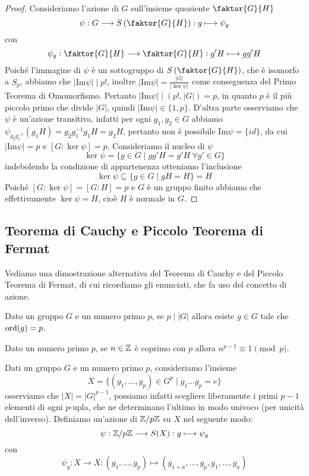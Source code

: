 \documentclass[11pt]{scrartcl}
\begin{document}
\begin{proof}
    Consideriamo l'azione di $G$ sull'insieme quoziente $\faktor{G}{H}$ 
    \[
        \psi: G\longrightarrow S\left(\faktor{G}{H}\right) : g \longmapsto \psi_g
    \]con 
    \[
        \psi_g : \faktor{G}{H}\longrightarrow\faktor{G}{H} : g'H\longmapsto gg'H
    \]Poiché l'immagine di $\psi$ è un sottogruppo di $S\left(\faktor{G}{H}\right)$,
    che è isomorfo a $S_p$, abbiamo che $|\mathrm{Im}\psi| \mid p!$, inoltre 
    $|\mathrm{Im}\psi| = \displaystyle\frac{|G|}{|\ker \psi|}$ come conseguenza
    del Primo Teorema di Omomorfismo. Pertanto $|\mathrm{Im}\psi| \mid (p!, |G|) = p$,
    in quanto $p$ è il più piccolo primo che divide $|G|$, quindi $|\mathrm{Im}\psi| \in \{1, p\}$.
    D'altra parte osserviamo che $\psi$ è un'azione transitiva, infatti per 
    ogni $g_1, g_2 \in G$ abbiamo $\psi_{g_2g_1^{-1}}(g_1H) = g_2g_1^{-1}g_1H = g_2H$,
    pertanto non è possibile $\mathrm{Im}\psi = \{id\}$, da cui $|\mathrm{Im}\psi| = p$
    e $[G:\ker\psi] = p$. Consideriamo il nucleo di $\psi$
    \[
        \ker\psi = \{g\in G\mid gg'H = g'H~\forall g' \in G\}
    \]indebolendo la condizione di appartenenza otteniamo l'inclusione
    \[
        \ker\psi \subseteq \{g \in G\mid gH = H\} = H
    \]Poiché $[G:\ker \psi] = [G : H] = p$ e $G$ è un gruppo finito abbiamo
    che effettivamente $\ker\psi = H$, cioè $H$ è normale in $G$.
\end{proof}


\subsection{Teorema di Cauchy e Piccolo Teorema di Fermat}

Vediamo una dimostrazione alternativa del Teorema di Cauchy e del Piccolo
Teorema di Fermat, di cui ricordiamo gli enunciati, che fa uso del concetto
 di azione. 

\begin{theorem}
    \label{teorema1.0}
    Dato un gruppo $G$ e un numero primo $p$, se $p\mid |G|$ allora esiste 
    $g \in G$ tale che $\operatorname{ord}(g) = p$.
\end{theorem}

\begin{theorem}
    \label{teorema2.0}
    Dato un numero primo $p$, se $n \in \mathbb Z$ è coprimo con $p$ allora 
    $n^{p - 1} \equiv 1 \pmod p$.
\end{theorem}

Dati un gruppo $G$ e un numero primo $p$, consideriamo l'insieme 
\[
    X = \{(g_1, \ldots, g_p) \in G^p\mid g_1\ldots g_p = e\}
\]osserviamo che $|X| = |G|^{p - 1}$, possiamo infatti scegliere liberamente
i primi $p - 1$ elementi di ogni $p$-upla, che ne determinano l'ultimo in 
modo univoco (per unicità dell'inverso). Definiamo un'azione di ${\mathbb Z}/p{\mathbb Z}$ su $X$
nel seguente modo:
\[
    \psi: {\mathbb Z}/p{\mathbb Z} \longrightarrow S(X) : g \longmapsto \psi_g
\]
con
\[
    \psi_g:X\longrightarrow X : (g_1, \ldots, g_p)\longmapsto (g_{1 + a}, \ldots, g_p, g_1, \ldots, g_a)
\]
\end{document}
